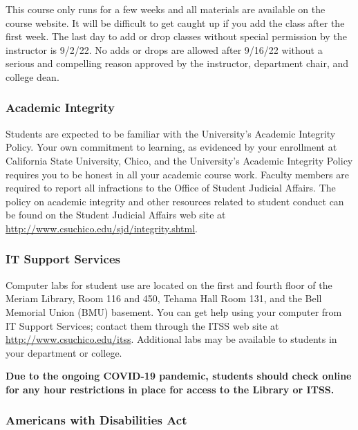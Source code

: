 \documentclass[
  11pt,
]{article}
\begin{document}
This course only runs for a few weeks and all materials are available on
the course website. It will be difficult to get caught up if you add the
class after the first week. The last day to add or drop classes without
special permission by the instructor is 9/2/22. No adds or drops are
allowed after 9/16/22 without a serious and compelling reason approved
by the instructor, department chair, and college dean.

\hypertarget{academic-integrity}{%
\subsubsection{Academic Integrity}\label{academic-integrity}}

Students are expected to be familiar with the University's Academic
Integrity Policy. Your own commitment to learning, as evidenced by your
enrollment at California State University, Chico, and the University's
Academic Integrity Policy requires you to be honest in all your academic
course work. Faculty members are required to report all infractions to
the Office of Student Judicial Affairs. The policy on academic integrity
and other resources related to student conduct can be found on the
Student Judicial Affairs web site at
\url{http://www.csuchico.edu/sjd/integrity.shtml}.

\hypertarget{it-support-services}{%
\subsubsection{IT Support Services}\label{it-support-services}}

Computer labs for student use are located on the first and fourth floor
of the Meriam Library, Room 116 and 450, Tehama Hall Room 131, and the
Bell Memorial Union (BMU) basement. You can get help using your computer
from IT Support Services; contact them through the ITSS web site at
\url{http://www.csuchico.edu/itss}. Additional labs may be available to
students in your department or college.

\textbf{Due to the ongoing COVID-19 pandemic, students should check
online for any hour restrictions in place for access to the Library or
ITSS.}

\hypertarget{americans-with-disabilities-act}{%
\subsubsection{Americans with Disabilities
Act}\label{americans-with-disabilities-act}}
\end{document}
